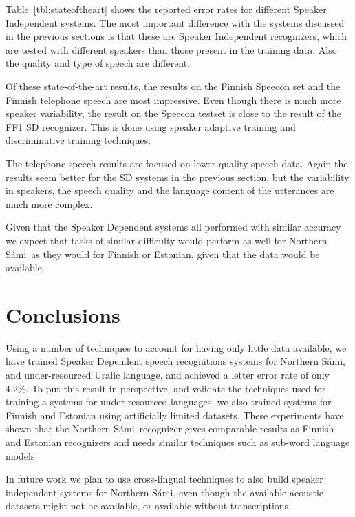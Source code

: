 \documentclass[b5paper]{article}
\newcommand{\todo}[2]{{\textcolor{red}{\bf [#1] #2 }}}
\newcommand{\ns}{Northern Sámi}
\begin{document}
Table~\ref{tbl:stateoftheart} shows the reported error rates for different Speaker Independent systems. The most important difference with the systems discussed in the previous sections is that these are Speaker Independent recognizers, which are tested with different speakers than those present in the training data. Also the quality and type of speech are different. 

Of these state-of-the-art results, the results on the Finnish Speecon set and the Finnish telephone speech are most impressive. Even though there is much more speaker variability, the result on the Speecon testset is close to the result of the FF1 SD recognizer. This is done using speaker adaptive training and discriminative training techniques. 

The telephone speech results are focused on lower quality speech data. Again the results seem better for the SD systems in the previous section, but the variability in speakers, the speech quality and the language content of the utterances are much more complex. 

Given that the Speaker Dependent systems all performed with similar accuracy we expect that tasks of similar difficulty would perform as well for \ns\ as they would for Finnish or Estonian, given that the data would be available.




\section{Conclusions} 
Using a number of techniques to account for having only little data available, we have trained Speaker Dependent speech recognitions systems for \ns, and under-resourced Uralic language, and achieved a letter error rate of only 4.2\%. To put this result in perspective, and validate the techniques used for training a systems for under-resourced languages, we also trained systems for Finnish and Estonian using artificially limited datasets. These experiments have shown that the \ns\ recognizer gives comparable results as Finnish and Estonian recognizers and needs similar techniques such as sub-word language models.


In future work we plan to use cross-lingual techniques to also build speaker independent systems for \ns, even though the available acoustic datasets might not be available, or available without transcriptions.
\end{document}
